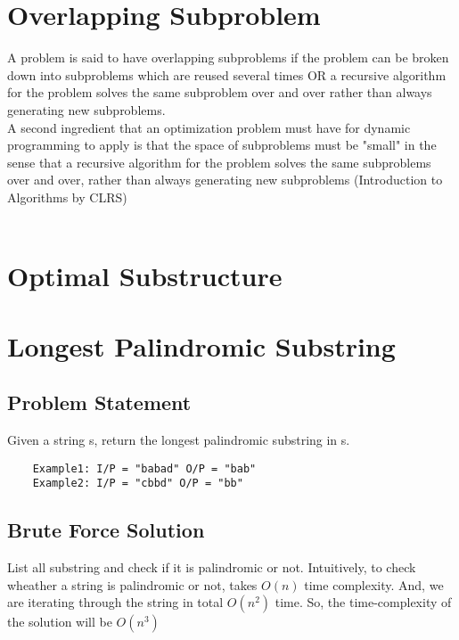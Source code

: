 	\section*{Overlapping Subproblem}
	
	A problem is said to have overlapping subproblems\cite{overlapping_subproblem} if the problem can be broken down into subproblems which are reused several times OR a recursive algorithm for the problem solves the same subproblem over and over rather than always generating new subproblems.\\
	
	A second ingredient that an optimization problem must have for dynamic programming to apply is that the space of subproblems must be "small" in the sense that a recursive algorithm for the problem solves the same subproblems over and over, rather than always generating new subproblems (Introduction to Algorithms by CLRS)\\
	
	
	‌
	
	
	
	\section*{Optimal Substructure}
	
	
	\newpage
	\section{Longest Palindromic Substring}
	
	\subsection*{Problem Statement}
	Given a string s, return the longest palindromic substring in s.
	\begin{verbatim}
	Example1: I/P = "babad" O/P = "bab"
	Example2: I/P = "cbbd" O/P = "bb"
	\end{verbatim}
	
	\subsection*{Brute Force Solution}
	List all substring and check if it is palindromic or not. Intuitively, to check wheather a string is palindromic or not, takes $O(n)$ time complexity. And, we are iterating through the string in total $O(n^2)$ time. So, the time-complexity of the solution will be $O(n^3)$
	
